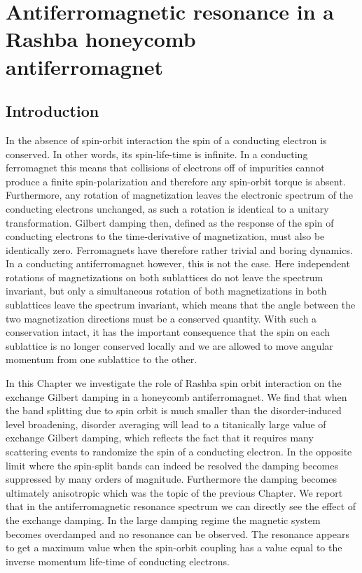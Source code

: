 \chapter{Antiferromagnetic resonance in a Rashba honeycomb antiferromagnet} %
\section{Introduction}
In the absence of spin-orbit interaction the spin of a conducting electron is conserved. In other words, its spin-life-time is infinite. In a conducting ferromagnet this means that collisions of electrons off of impurities cannot produce a finite spin-polarization and therefore any spin-orbit torque is absent. Furthermore, any rotation of magnetization leaves the electronic spectrum of the conducting electrons unchanged, as such a rotation is identical to a unitary transformation. Gilbert damping then, defined as the response of the spin of conducting electrons to the time-derivative of magnetization, must also be identically zero. Ferromagnets have therefore rather trivial and boring dynamics. In a conducting antiferromagnet however, this is not the case. Here independent rotations of magnetizations on both sublattices do not leave the spectrum invariant, but only a simultaneous rotation of both magnetizations in both sublattices leave the spectrum invariant, which means that the angle between the two magnetization directions must be a conserved quantity. With such a conservation intact, it has the important consequence that the spin on each sublattice is no longer conserved locally and we are allowed to move angular momentum from one sublattice to the other.   

In this Chapter we investigate the role of Rashba spin orbit interaction on the exchange Gilbert damping in a honeycomb antiferromagnet. We find that when the band splitting due to spin orbit is much smaller than the disorder-induced level broadening, disorder averaging will lead to a titanically large value of exchange Gilbert damping, which reflects the fact that it requires many scattering events to randomize the spin of a conducting electron. In the opposite limit where the spin-split bands can indeed be resolved the damping becomes suppressed by many orders of magnitude. Furthermore the damping becomes ultimately anisotropic which was the topic of the previous Chapter. We report that in the antiferromagnetic resonance spectrum we can directly see the effect of the exchange damping. In the large damping regime the magnetic system becomes overdamped and no resonance can be observed. The resonance appears to get a maximum value when the spin-orbit coupling has a value equal to the inverse momentum life-time of conducting electrons. 

